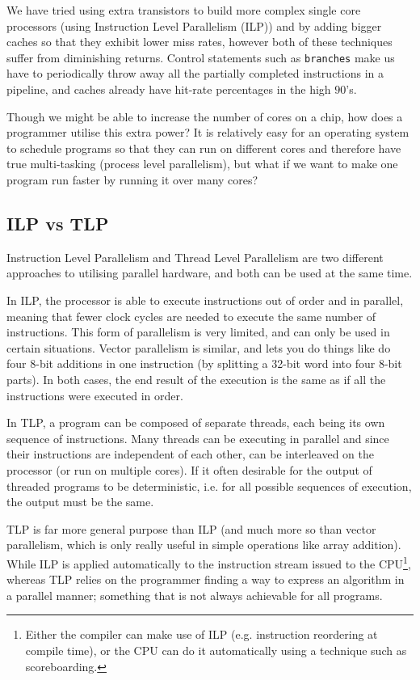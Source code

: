 We have tried using extra transistors to build more complex single core
processors (using Instruction Level Parallelism (ILP)) and by adding bigger
caches so that they exhibit lower miss rates, however both of these techniques
suffer from diminishing returns. Control statements such as \texttt{branches}
make us have to periodically throw away all the partially completed instructions
in a pipeline, and caches already have hit-rate percentages in the high $90$'s.

Though we might be able to increase the number of cores on a chip, how does a
programmer utilise this extra power? It is relatively easy for an operating
system to schedule programs so that they can run on different cores and
therefore have true multi-tasking (process level parallelism), but what if we
want to make one program run faster by running it over many cores?

\subsection{ILP vs TLP}

Instruction Level Parallelism and Thread Level Parallelism are two different
approaches to utilising parallel hardware, and both can be used at the same
time.

In ILP, the processor is able to execute instructions out of order and in
parallel, meaning that fewer clock cycles are needed to execute the same number
of instructions. This form of parallelism is very limited, and can only be used
in certain situations. Vector parallelism is similar, and lets you do things
like do four 8-bit additions in one instruction (by splitting a 32-bit word into
four 8-bit parts). In both cases, the end result of the execution is the same as
if all the instructions were executed in order.

In TLP, a program can be composed of separate threads, each being its own
sequence of instructions. Many threads can be executing in parallel and since
their instructions are independent of each other, can be interleaved on the
processor (or run on multiple cores). If it often desirable for the output of
threaded programs to be deterministic, i.e. for all possible sequences of
execution, the output must be the same.

TLP is far more general purpose than ILP (and much more so than vector
parallelism, which is only really useful in simple operations like array
addition). While ILP is applied automatically to the instruction stream issued
to the CPU\footnote{Either the compiler can make use of ILP (e.g. instruction
reordering at compile time), or the CPU can do it automatically using a
technique such as scoreboarding.}, whereas TLP relies on the programmer finding
a way to express an algorithm in a parallel manner; something that is not always
achievable for all programs.

